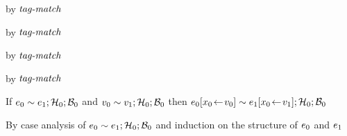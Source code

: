 \begin{lamportproof}
    \begin{pfproof}
      \qedstep
        \begin{pfproof}
          by $\textit{tag-match}$
        \end{pfproof}
    \end{pfproof}

    \begin{pfproof}
      \qedstep
        \begin{pfproof}
          by $\textit{tag-match}$
        \end{pfproof}
    \end{pfproof}

    \begin{pfproof}
      \qedstep
        \begin{pfproof}
          by $\textit{tag-match}$
        \end{pfproof}
    \end{pfproof}

    \begin{pfproof}
      \qedstep
        \begin{pfproof}
          by $\textit{tag-match}$
        \end{pfproof}
    \end{pfproof}

\end{lamportproof}

\begin{lemma}\label{AT-value-subst}
  If\/ $e_0 \sim e_1; \mathcal{H}_0; \mathcal{B}_0$
  and\/ $v_0 \sim v_1; \mathcal{H}_0; \mathcal{B}_0$
  then\/ $e_0[x_0\!\leftarrow\!v_0] \sim e_1[x_0\!\leftarrow\!v_1]; \mathcal{H}_0; \mathcal{B}_0$
\end{lemma}
\begin{lamportproof}
  By case analysis of $e_0 \sim e_1; \mathcal{H}_0; \mathcal{B}_0$
  and induction on the structure of $e_0$ and $e_1$
\end{lamportproof}

